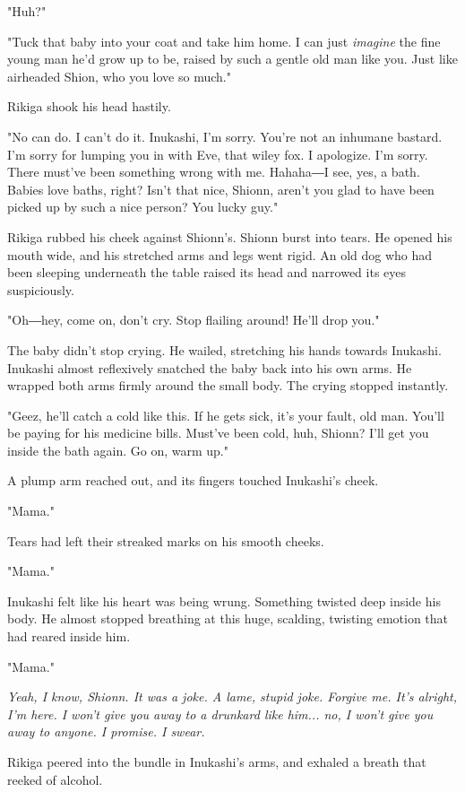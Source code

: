 "Huh?"

"Tuck that baby into your coat and take him home. I can just \emph{imagine} the
fine young man he'd grow up to be, raised by such a gentle old man like
you. Just like airheaded Shion, who you love so much."

Rikiga shook his head hastily.

"No can do. I can't do it. Inukashi, I'm sorry. You're not an inhumane
bastard. I'm sorry for lumping you in with Eve, that wiley fox. I
apologize. I'm sorry. There must've been something wrong with me.
Hahaha―I see, yes, a bath. Babies love baths, right? Isn't that nice,
Shionn, aren't you glad to have been picked up by such a nice person?
You lucky guy."

Rikiga rubbed his cheek against Shionn's. Shionn burst into tears. He
opened his mouth wide, and his stretched arms and legs went rigid. An
old dog who had been sleeping underneath the table raised its head and
narrowed its eyes suspiciously.

"Oh―hey, come on, don't cry. Stop flailing around! He'll drop you."

The baby didn't stop crying. He wailed, stretching his hands towards
Inukashi. Inukashi almost reflexively snatched the baby back into his
own arms. He wrapped both arms firmly around the small body. The crying
stopped instantly.

"Geez, he'll catch a cold like this. If he gets sick, it's your fault,
old man. You'll be paying for his medicine bills. Must've been cold,
huh, Shionn? I'll get you inside the bath again. Go on, warm up."

A plump arm reached out, and its fingers touched Inukashi's cheek.

"Mama."

Tears had left their streaked marks on his smooth cheeks.

"Mama."

Inukashi felt like his heart was being wrung. Something twisted deep
inside his body. He almost stopped breathing at this huge, scalding,
twisting emotion that had reared inside him.

"Mama."

\emph{Yeah, I know, Shionn. It was a joke. A lame, stupid joke. Forgive me.
	It's alright, I'm here. I won't give you away to a drunkard like him...
	no, I won't give you away to anyone. I promise. I swear.}

\mybreak

Rikiga peered into the bundle in Inukashi's arms, and exhaled a breath
that reeked of alcohol.

